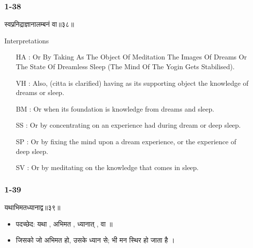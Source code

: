 \begin{frame}[fragile]\frametitle{1-38}
\begin{sanskrit}
स्वप्ननिद्राज्ञानालम्बनं वा॥३८॥
\end{sanskrit}

Interpretations
\begin{itemize}	
\item [HA]: Or By Taking As The Object Of Meditation The Images Of Dreams Or The State Of Dreamless Sleep (The Mind Of The Yogin Gets Stabilised).
\item [VH]: Also, (citta is clarified) having as its supporting object the knowledge of dreams or sleep.
\item [BM]: Or when its foundation is knowledge from dreams and sleep.
\item [SS]: Or by concentrating on an experience had during dream or deep sleep.
\item [SP]: Or by fixing the mind upon a dream experience, or the experience of deep sleep.
\item [SV]: Or by meditating on the knowledge that comes in sleep. 
\end{itemize}
	
\end{frame}


\begin{frame}[fragile]\frametitle{1-39}
\begin{sanskrit}
यथाभिमतध्यानाद्व॥३९॥
\end{sanskrit}

\begin{itemize}
\item पदच्छेद: यथा , अभिमत , ध्यानात् , वा ॥
\item जिसको जो अभिमत हो, उसके ध्यान से; भी मन स्थिर हो जाता है ।
\end{itemize}
	
\end{frame}

